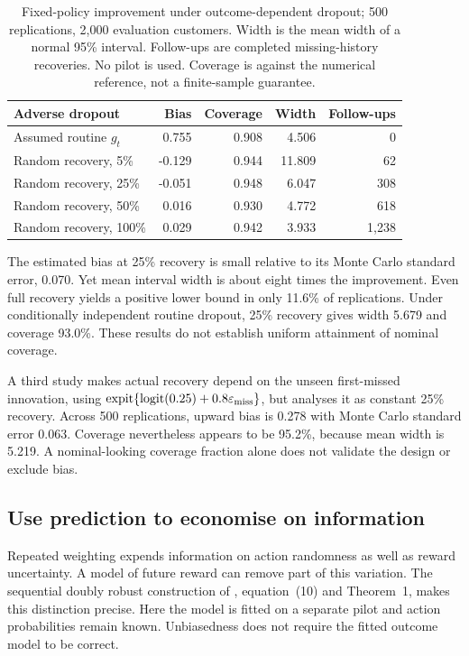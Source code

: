\begin{table}[htbp]
\centering\small
\begin{tabular}{lrrrr}
\toprule
Adverse dropout & Bias & Coverage & Width & Follow-ups\\
\midrule
Assumed routine $g_t$ & 0.755 & 0.908 & 4.506 & 0\\
Random recovery, 5\% & -0.129 & 0.944 & 11.809 & 62\\
Random recovery, 25\% & -0.051 & 0.948 & 6.047 & 308\\
Random recovery, 50\% & 0.016 & 0.930 & 4.772 & 618\\
Random recovery, 100\% & 0.029 & 0.942 & 3.933 & 1,238\\
\bottomrule
\end{tabular}
\caption{Fixed-policy improvement under outcome-dependent dropout;
500 replications, 2,000 evaluation customers. Width is the mean width of a
normal 95\% interval. Follow-ups are completed missing-history recoveries.
No pilot is used. Coverage is against the numerical reference, not a
finite-sample guarantee.}
\end{table}

The estimated bias at 25\% recovery is small relative to its Monte Carlo
standard error, 0.070. Yet mean interval width is about eight times the
improvement. Even full recovery yields a positive lower bound in only
11.6\% of replications. Under conditionally independent routine dropout,
25\% recovery gives width 5.679 and coverage 93.0\%. These results do not
establish uniform attainment of nominal coverage.

A third study makes actual recovery depend on the unseen first-missed
innovation, using
$\operatorname{expit}\{\operatorname{logit}(0.25)+0.8\varepsilon_{\rm miss}\}$,
but analyses it as constant 25\% recovery. Across 500 replications, upward
bias is 0.278 with Monte Carlo standard error 0.063. Coverage nevertheless
appears to be 95.2\%, because mean width is 5.219. A nominal-looking
coverage fraction alone does not validate the design or exclude bias.

\subsection{Use prediction to economise on information}
Repeated weighting expends information on action randomness as well as
reward uncertainty. A model of future reward can remove part of this
variation. The sequential doubly robust construction of
\citet{jiang2016}, equation~(10) and Theorem~1, makes this distinction
precise. Here the model is fitted on a separate pilot and action
probabilities remain known. Unbiasedness does not require the fitted
outcome model to be correct.


